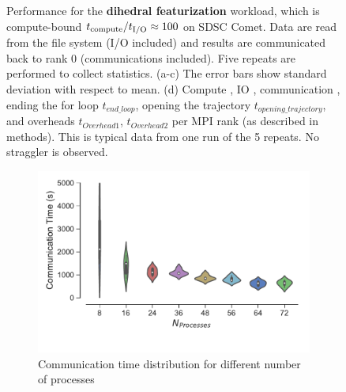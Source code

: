 \begin{figure}[ht!]
\caption{Performance for the \textbf{dihedral featurization} workload,
which is compute-bound ${t}_{\text{compute}}/{t}_{\text{I/O}} \approx 100$ on SDSC Comet. Data are read from the file system (I/O included) 
and results are communicated back to rank 0 (communications included). Five repeats are performed to collect statistics. 
(a-c) The error bars show standard deviation with respect to mean. (d) Compute \tcomp, IO \tIO, communication \tcomm, ending the for loop $t_{end\_loop}$,
  opening the trajectory $t_{opening\_trajectory}$, and overheads $t_{Overhead1}$,  $t_{Overhead2}$ per MPI rank (as described in methods).
  This is typical data from one run of the 5 repeats. No straggler is observed.} 
\label{fig:MPIwithIO-dihed}
\end{figure} 

\begin{figure}[ht!]
\begin{subfigure} {.55\textwidth}
  \centering
  \includegraphics[width=\linewidth]{figures/ViolinPlot-Ncores-comparison-comm-dihedral.pdf}
  \caption{Communication time distribution for different number of
    processes}
\end{subfigure}
\hfill
\begin{subfigure}{.35\textwidth}
  \centering

\end{subfigure}
\end{figure}
